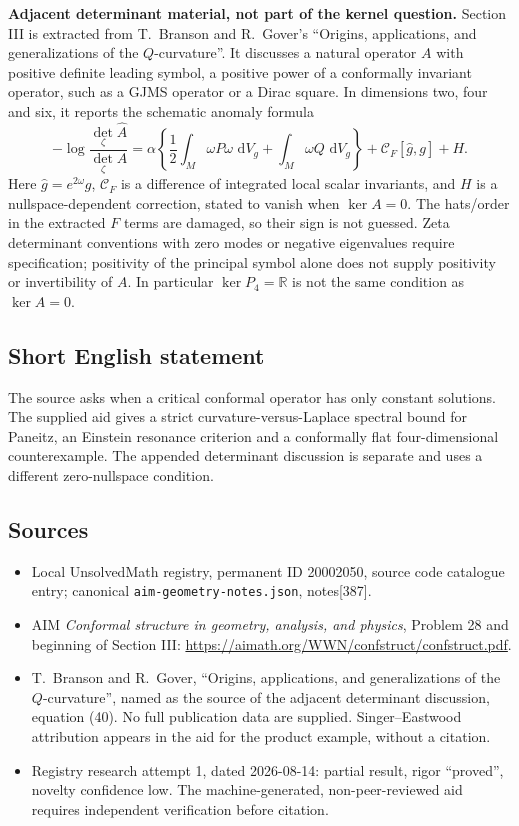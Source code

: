 \documentclass[11pt]{article}
\newcommand{\R}{\mathbb{R}}
\newcommand{\dd}{\,\mathrm{d}}
\begin{document}
\textbf{Adjacent determinant material, not part of the kernel question.} Section III is extracted from T.~Branson and R.~Gover's ``Origins, applications, and generalizations of the $Q$-curvature''. It discusses a natural operator $A$ with positive definite leading symbol, a positive power of a conformally invariant operator, such as a GJMS operator or a Dirac square. In dimensions two, four and six, it reports the schematic anomaly formula
\[
 -\log\frac{\det_\zeta\widehat A}{\det_\zeta A}
 =\alpha\left\{\frac12\int_M\omega P\omega\,\dd V_g
                  +\int_M\omega Q\,\dd V_g\right\}
       +\mathcal C_F[\widehat g,g]+H.
\]
Here $\widehat g=e^{2\omega}g$, $\mathcal C_F$ is a difference of integrated local scalar invariants, and $H$ is a nullspace-dependent correction, stated to vanish when $\ker A=0$. The hats/order in the extracted $F$ terms are damaged, so their sign is not guessed. Zeta determinant conventions with zero modes or negative eigenvalues require specification; positivity of the principal symbol alone does not supply positivity or invertibility of $A$. In particular $\ker P_4=\R$ is not the same condition as $\ker A=0$.
\subsection{Short English statement}
The source asks when a critical conformal operator has only constant solutions. The supplied aid gives a strict curvature-versus-Laplace spectral bound for Paneitz, an Einstein resonance criterion and a conformally flat four-dimensional counterexample. The appended determinant discussion is separate and uses a different zero-nullspace condition.
\subsection{Sources}
\begin{itemize}
\item Local UnsolvedMath registry, permanent ID 20002050, source code catalogue entry; canonical \texttt{aim-geometry-notes.json}, notes[387].
\item AIM \emph{Conformal structure in geometry, analysis, and physics}, Problem 28 and beginning of Section III: \url{https://aimath.org/WWN/confstruct/confstruct.pdf}.
\item T.~Branson and R.~Gover, ``Origins, applications, and generalizations of the $Q$-curvature'', named as the source of the adjacent determinant discussion, equation (40). No full publication data are supplied. Singer--Eastwood attribution appears in the aid for the product example, without a citation.
\item Registry research attempt 1, dated 2026-08-14: partial result, rigor ``proved'', novelty confidence low. The machine-generated, non-peer-reviewed aid requires independent verification before citation.
\end{itemize}
\end{document}
